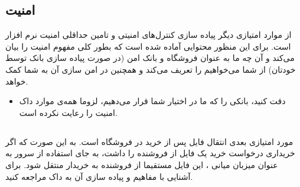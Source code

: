 \documentclass[]{article}
\begin{document}
\subsection*{{\titr امنیت}}

از موارد امتیازی دیگر پیاده سازی کنترل‌های امنیتی و تامین حداقلی امنیت نرم افزار است. برای این منظور محتوایی آماده شده است که بطور کلی مفهوم امنیت را بیان می‌کند و آن چه ما به عنوان فروشگاه و بانک امن (در صورت پیاده سازی بانک توسط خودتان) از شما می‌خواهیم را تعریف می‌کند و همچنین در امن سازی آن به شما کمک خواهد.

\begin{itemize}[label = $\star$]
\item

دقت کنید، بانکی را که ما در اختیار شما قرار می‌دهیم، لزوما همه‌ی موارد \textcolor{CustomColor}{داک امنیت} را رعایت نکرده است.

\end{itemize}




\subsection*{{}}
\label{subsec:p2p}

مورد امتیازی بعدی انتقال  فایل پس از خرید در فروشگاه است. به این صورت که اگر خریداری درخواست خرید یک فایل از فروشنده را داشت،‌ به جای استفاده از سرور به عنوان میزبان میانی ، این فایل مستقیما از فروشنده به خریدار منتقل شود. برای آشنایی با مفاهیم  و پیاده سازی آن به \textcolor{CustomColor}{داک } مراجعه کنید.
\end{document}
